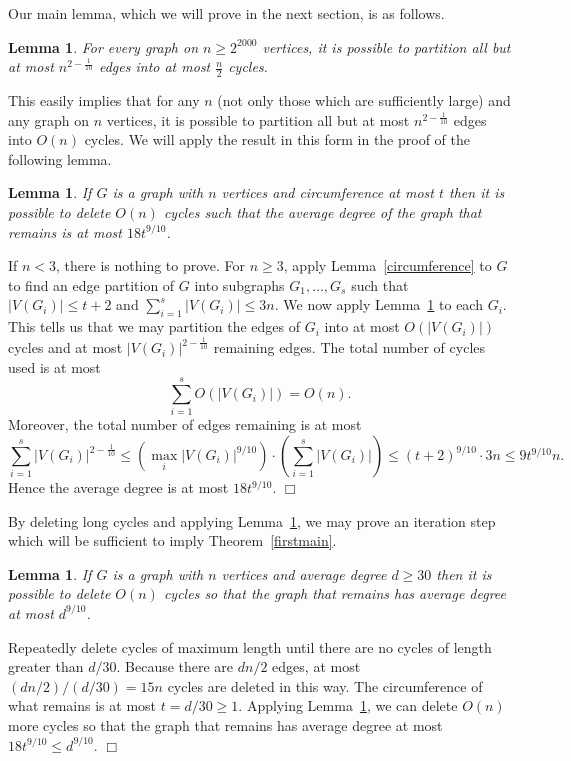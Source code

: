 \documentclass[11pt]{article}
\newtheorem{lemma}[theorem]{Lemma}
\newenvironment{proof}
      {\medskip\noindent{\bf Proof:}\hspace{1mm}}
      {\hfill$\Box$\medskip}
\begin{document}
Our main lemma, which we will prove in the next section, is as follows.

\begin{lemma} \label{lem:main}
For every graph on $n \geq 2^{2000}$ vertices, it is possible to partition all but at most $n^{2 - \frac{1}{10}}$ edges into at most $\frac{n}{2}$ cycles.
\end{lemma}

This easily implies that for any $n$ (not only those which are sufficiently large) and any graph on $n$ vertices, it is possible to partition all but at most $n^{2 - \frac{1}{10}}$ edges into $O(n)$ cycles. We will apply the result in this form in the proof of the following lemma.

\begin{lemma}\label{almostthere}
If $G$ is a graph with $n$ vertices and circumference at most $t$ then it is possible to delete $O(n)$ cycles such that the average degree of the graph that remains is at most $18 t^{9/10}$.
\end{lemma}

\begin{proof}
If $n < 3$, there is nothing to prove. For $n \geq 3$, apply Lemma~\ref{circumference} to $G$ to find an edge partition of $G$ into subgraphs $G_1, \dots, G_s$ such that $|V(G_i)| \leq t + 2$ and $\sum_{i=1}^s |V(G_i)| \leq 3 n$. We now apply Lemma~\ref{lem:main} to each $G_i$. This tells us that we may partition the edges of $G_i$ into at most $O(|V(G_i)|)$ cycles and at most $|V(G_i)|^{2-\frac{1}{10}}$ remaining edges. The total number of cycles used is at most
\[\sum_{i=1}^s O(|V(G_i)|) = O(n).\]
Moreover, the total number of edges remaining is at most
\[\sum_{i=1}^s |V(G_i)|^{2 - \frac{1}{10}} \leq \left(\max_i |V(G_i)|^{9/10}\right) \cdot \left(\sum_{i=1}^s |V(G_i)|\right) \leq (t + 2)^{9/10} \cdot 3n \leq 9 t^{9/10} n.\]
Hence the average degree is at most $18t^{9/10}$.
\end{proof}

By deleting long cycles and applying Lemma~\ref{almostthere}, we may prove an iteration step which will be sufficient to imply Theorem~\ref{firstmain}.

\begin{lemma}\label{noreallyalmostthere}
If $G$ is a graph with $n$ vertices and average degree $d \geq 30$ then it is possible to delete $O(n)$ cycles so that the graph that remains has average degree at most $d^{9/10}$.
\end{lemma}

\begin{proof}
Repeatedly delete cycles of maximum length until there are no cycles of length greater than $d/30$. Because there are $dn/2$ edges, at most $(dn/2)/(d/30) = 15n$ cycles are deleted in this way. The circumference of what remains is at most $t = d/30 \geq 1$. Applying Lemma~\ref{almostthere}, we can delete $O(n)$ more cycles so that the graph that remains has average degree at most $18 t^{9/10} \leq d^{9/10}$.
\end{proof}
\end{document}
